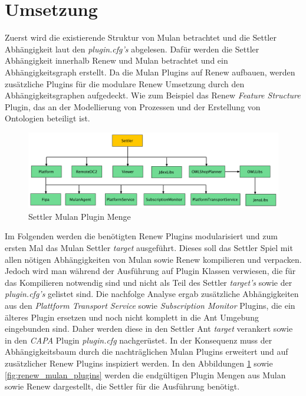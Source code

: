 \section{Umsetzung}
	Zuerst wird die existierende Struktur von Mulan betrachtet und die Settler Abhängigkeit laut den \textit{plugin.cfg's} abgelesen. Dafür werden die Settler Abhängigkeit innerhalb Renew und Mulan betrachtet und ein Abhängigkeitsgraph erstellt. Da die Mulan Plugins auf Renew aufbauen, werden zusätzliche Plugins für die modulare Renew Umsetzung durch den Abhängigkeitsgraphen aufgedeckt. Wie zum Beispiel das Renew \textit{Feature Structure} Plugin, das an der Modellierung von Prozessen und der Erstellung von Ontologien beteiligt ist. \bigbreak
	\begin{figure}[h!]
	  \centering
	  \includegraphics[width=\textwidth]{material/images/settler-mulan-plugins.pdf}
	  \caption{Settler Mulan Plugin Menge}
	  \label{fig:settler_mulan_plugins}
	\end{figure}
	Im Folgenden werden die benötigten Renew Plugins modularisiert und zum ersten Mal das Mulan Settler \textit{target} ausgeführt. Dieses soll das Settler Spiel mit allen nötigen Abhängigkeiten von Mulan sowie Renew kompilieren und verpacken. Jedoch wird man während der Ausführung auf Plugin Klassen verwiesen, die für das Kompilieren notwendig sind und nicht als Teil des Settler \textit{target's} sowie der \textit{plugin.cfg's} gelistet sind. \newline
	Die nachfolge Analyse ergab zusätzliche Abhängigkeiten aus den \textit{Plattform Transport Service} sowie \textit{Subscription Monitor} Plugins, die ein älteres Plugin ersetzen und noch nicht komplett in die Ant Umgebung eingebunden sind. Daher werden diese in den Settler Ant \textit{target} verankert sowie in den \textit{CAPA} Plugin \textit{plugin.cfg} nachgerüstet. In der Konsequenz muss der Abhängigkeitsbaum durch die nachträglichen Mulan Plugins erweitert und auf zusätzlicher Renew Plugins inspiziert werden. \newline
	In den Abbildungen \ref{fig:settler_mulan_plugins} sowie \ref{fig:renew_mulan_plugins} werden die endgültigen Plugin Mengen aus Mulan sowie Renew dargestellt, die Settler für die Ausführung benötigt. \bigbreak
